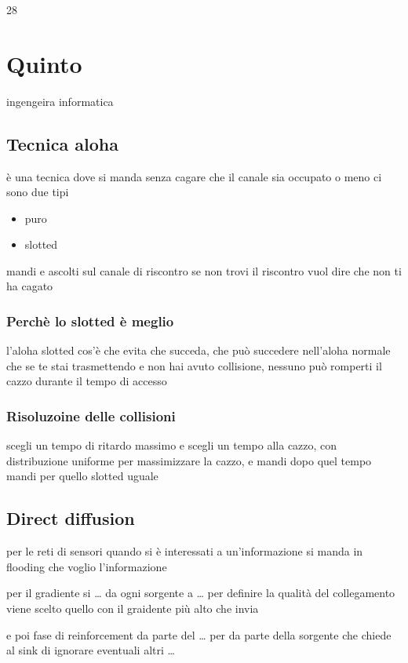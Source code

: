\documentclass[11pt]{article}
\begin{document}
28

\section{Quinto}
\label{sec:org2989366}
ingengeira informatica
\subsection{Tecnica aloha}
\label{sec:org0a4c7fc}
è una tecnica dove si manda senza cagare che il canale sia occupato o meno
ci sono due tipi
\begin{itemize}
\item puro
\item slotted
\end{itemize}

mandi e ascolti sul canale di riscontro
se non trovi il riscontro vuol dire che non ti ha cagato

\subsubsection{Perchè lo slotted è meglio}
\label{sec:orgacaad27}
l'aloha slotted cos'è che evita che succeda, che può succedere nell'aloha normale
che se te stai trasmettendo e non hai avuto collisione, nessuno può romperti il cazzo durante il tempo di accesso

\subsubsection{Risoluzoine delle collisioni}
\label{sec:orgfe8d37b}
scegli un tempo di ritardo massimo e scegli un tempo alla cazzo, con distribuzione uniforme per massimizzare la cazzo, e mandi dopo quel tempo mandi
per quello slotted uguale

\subsection{Direct diffusion}
\label{sec:orgf5aa814}
per le reti di sensori
quando si è interessati a un'informazione si manda in flooding che voglio l'informazione

per il gradiente si \ldots{} da ogni sorgente a \ldots{} per definire la qualità del collegamento
viene scelto quello con il graidente più alto che invia

e poi fase di reinforcement da parte del \ldots{} per da parte della sorgente che chiede al sink di ignorare eventuali altri \ldots{}
\end{document}
